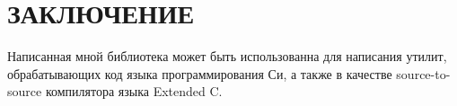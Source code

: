 \chapter*{ЗАКЛЮЧЕНИЕ}                       %


Написанная мной библиотека может быть использованна для написания утилит, обрабатывающих код языка программирования Си, 
а также в качестве source-to-source компилятора языка Extended C.
